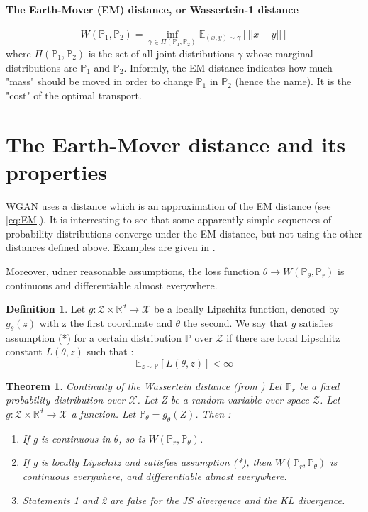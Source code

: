\documentclass[a4paper]{report}
\newcommand{\X}{\mathcal{X}}
\newcommand{\Expec}{\mathbb{E}}
\newcommand{\Prob}{\mathbb{P}}
\newcommand{\real}{\mathbb{R}}
\theoremstyle{plain}
\newtheorem{thm}{Theorem}
\theoremstyle{remark}
\theoremstyle{definition}
\newtheorem{defi}{Definition}
\begin{document}
\paragraph{The Earth-Mover (EM) distance, or Wassertein-1 distance}
\begin{equation}
\label{eq:EM}
W(\Prob_1, \Prob_2) = \inf_{\gamma \in \Pi(\Prob_1,\Prob_2)} \Expec_{(x,y) \sim \gamma}[ ||x-y||]
\end{equation}
where $\Pi(\Prob_1,\Prob_2)$ is the set of all joint distributions $\gamma$ whose marginal distributions are $\Prob_1$ and $\Prob_2$. Informly, the EM distance indicates how much "mass" should be moved in order to change $\Prob_1$ in $\Prob_2$ (hence the name). It is the "cost" of the optimal transport.

\section{The Earth-Mover distance and its properties}

WGAN uses a distance which is an approximation of the EM distance (see \ref{eq:EM}).
It is interresting to see that some apparently simple sequences of probability distributions converge under the EM distance, but not using the other distances defined above. Examples are given in \cite{arjovsky2017wasserstein}.

Moreover, udner reasonable assumptions, the loss function $\theta \rightarrow W(\Prob_\theta , \Prob_r)$ is continuous and differentiable almost everywhere.

\begin{defi}
Let $g : \mathcal{Z}\times\real^d \rightarrow \X$ be a locally Lipschitz function, denoted by $g_\theta(z)$ with z the first coordinate and $\theta$ the second. We say that $g$ satisfies assumption (*) for a certain distribution $\Prob$ over $\mathcal{Z}$ if there are local Lipschitz constant $L(\theta,z)$ such that :
$$\Expec_{z \sim \Prob}[L(\theta,z)] < \infty$$ 
\end{defi}

\begin{thm}{Continuity of the Wassertein distance (from \cite{arjovsky2017wasserstein})}
Let $\Prob_r$ be a fixed probability distribution over $\X$. Let Z be a random variable over space $\mathcal{Z}$. Let $g : \mathcal{Z}\times\real^d \rightarrow \X$ a function. Let $\Prob_\theta = g_\theta(Z)$. Then :

\begin{enumerate}
\item If g is continuous in $\theta$, so is $W(\Prob_r, \Prob_\theta)$.
\item If g is locally Lipschitz and satisfies assumption (*), then $W(\Prob_r , \Prob_\theta)$
is continuous everywhere, and differentiable almost everywhere.
\item Statements 1 and 2 are false for the JS divergence and the KL divergence.
\end{enumerate}
\end{thm}
\end{document}
